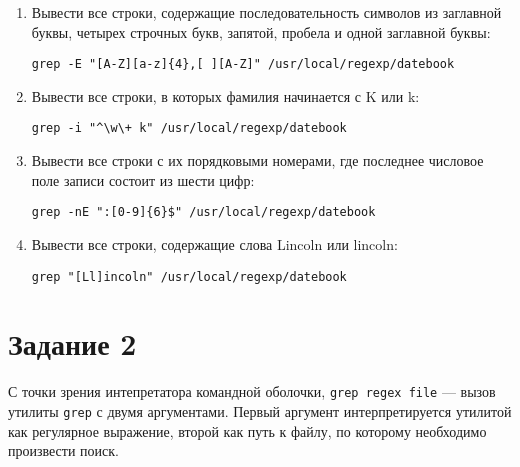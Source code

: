 \documentclass[listings]{labreport}
\begin{document}
\begin{enumerate}
\item Вывести все строки, содержащие последовательность символов из
  заглавной буквы, четырех строчных букв, запятой, пробела и одной заглавной буквы:
\begin{verbatim}
grep -E "[A-Z][a-z]{4},[ ][A-Z]" /usr/local/regexp/datebook
\end{verbatim}

\item Вывести все строки, в которых фамилия начинается с K или k:
\begin{verbatim}
grep -i "^\w\+ k" /usr/local/regexp/datebook
\end{verbatim}

\item Вывести все строки с их порядковыми номерами, где последнее числовое поле записи состоит из шести цифр:
\begin{verbatim}
grep -nE ":[0-9]{6}$" /usr/local/regexp/datebook
\end{verbatim}

\item Вывести все строки, содержащие слова Lincoln или lincoln:
\begin{verbatim}
grep "[Ll]incoln" /usr/local/regexp/datebook
\end{verbatim}
\end{enumerate}

\section*{Задание 2}

С точки зрения интепретатора командной оболочки, \verb|grep regex file| —
вызов утилиты \verb|grep| с двумя аргументами.
Первый аргумент интерпретируется утилитой как регулярное выражение,
второй как путь к файлу, по которому необходимо произвести поиск.
\end{document}
